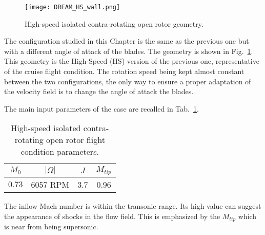 
\begin{figure}[htp]
  \centering
  \texttt{[image: DREAM\_HS\_wall.png]}
  \caption{High-speed isolated contra-rotating open rotor geometry.}
  \label{fig:dream_hs_wall}
\end{figure}

The configuration studied in this Chapter is the same as the
previous one but with a different angle of attack of
the blades. The geometry is shown in Fig.~\ref{fig:dream_hs_wall}.
This geometry is the High-Speed (HS) version of the previous one, 
representative of the cruise flight condition. The rotation speed being kept
almost constant between the two configurations, the only way to ensure
a proper adaptation of the velocity field is to change the angle of 
attack the blades.

The main input parameters of the case are recalled in
Tab.~\ref{tab:dream_hs_flight_condition}.
\begin{table}[htp]
   \centering
  \begin{tabular}{cccc}
    \toprule
    $M_0$ & $|\Omega|$ & $J$ & $M_{tip}$ \\
    \midrule
    $0.73$ & $6057$ RPM & 3.7 & 0.96  \\
    \bottomrule
  \end{tabular}
  \caption{High-speed isolated contra-rotating open rotor flight condition parameters.}
  \label{tab:dream_hs_flight_condition}
\end{table} 
The inflow Mach number is within the transonic range. Its high value
can suggest the appearance of shocks in the flow field. 
This is emphasized by the $M_{tip}$ which is
near from being supersonic.

